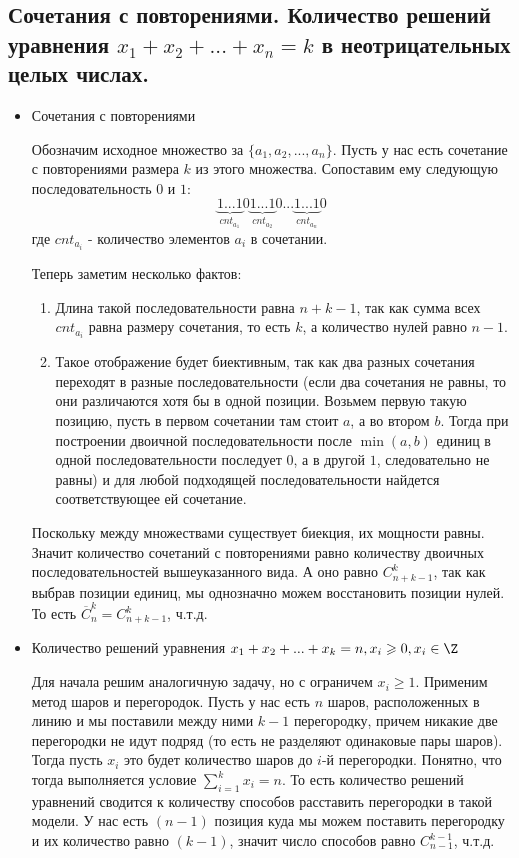 \subsection{Сочетания с повторениями. Количество решений уравнения $x_1 + x_2 + ... + x_n = k$ в неотрицательных целых числах.}

\begin{itemize}
	\item Сочетания с повторениями
	
	Обозначим исходное множество за $\{a_1, a_2, ..., a_n\}$. Пусть у нас есть сочетание с повторениями размера $k$ из этого множества. Сопоставим ему следующую последовательность $0$ и $1$:
	$$\underbrace{1...1}_{cnt_{a_1}}0\underbrace{1...1}_{cnt_{a_2}}0...\underbrace{1...1}_{cnt_{a_n}}0$$
	где $cnt_{a_i}$ - количество элементов $a_i$ в сочетании.
	
	Теперь заметим несколько фактов:
	\begin{enumerate}
		\item Длина такой последовательности равна $n + k - 1$, так как сумма всех $cnt_{a_i}$ равна размеру сочетания, то есть $k$, а количество нулей равно $n - 1$.
		\item Такое отображение будет биективным, так как два разных сочетания переходят в разные последовательности (если два сочетания не равны, то они различаются хотя бы в одной позиции. Возьмем первую такую позицию, пусть в первом сочетании там стоит $a$, а во втором $b$. Тогда при построении двоичной последовательности после $\min{(a, b)}$ единиц в одной последовательности последует $0$, а в другой $1$, следовательно не равны) и для любой подходящей последовательности найдется соответствующее ей сочетание.
	\end{enumerate}

	Поскольку между множествами существует биекция, их мощности равны. Значит количество сочетаний с повторениями равно количеству двоичных последовательностей вышеуказанного вида. А оно равно $C^k_{n+k-1}$, так как выбрав позиции единиц, мы однозначно можем восстановить позиции нулей. То есть $\overline C^k_n = C^k_{n+k-1}$, ч.т.д.
	
	\item Количество решений уравнения $x_1 + x_2 + ... + x_k = n, x_i \geqslant 0, x_i \in \Z$
	
	Для начала решим аналогичную задачу, но с ограничем $x_i \geqslant 1$. Применим метод шаров и перегородок. Пусть у нас есть $n$ шаров, расположенных в линию и мы поставили между ними $k - 1$ перегородку, причем никакие две перегородки не идут подряд (то есть не разделяют одинаковые пары шаров). Тогда пусть $x_i$ это будет количество шаров до $i$-й перегородки. Понятно, что тогда выполняется условие $\sum_{i=1}^{k}x_i = n$. То есть количество решений уравнений сводится к количеству способов расставить перегородки в такой модели. У нас есть $(n - 1)$ позиция куда мы можем поставить перегородку и их количество равно $(k - 1)$, значит число способов равно $C^{k-1}_{n-1}$, ч.т.д.
	
\end{itemize}